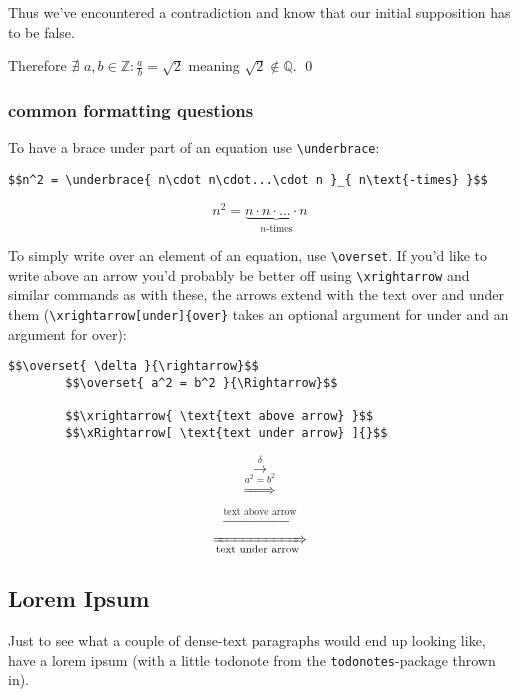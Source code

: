 \documentclass{article}
\begin{document}
    Thus we've encountered a contradiction and know that our initial
    supposition has to be false. 

    Therefore $\nexists \,\, a,b\in\mathbb{Z} : \frac{a}{b} = \sqrt{2}$ meaning
    $\sqrt{2} \not\in \mathbb{Q}$. 
    \qed

    \subsubsection{common formatting questions}
    To have a brace under part of an equation use \verb|\underbrace|:  
    \begin{lstlisting}[style=LaTeX]
        $$n^2 = \underbrace{ n\cdot n\cdot...\cdot n }_{ n\text{-times} }$$
    \end{lstlisting}
        $$n^2 = \underbrace{ n\cdot n\cdot...\cdot n }_{ n\text{-times} }$$

    To simply write over an element of an equation, use \verb|\overset|. 
    If you'd like to write above an arrow you'd probably be better off using
    \verb|\xrightarrow| and similar commands as with these, the arrows extend
    with the text over and under them (\verb|\xrightarrow[under]{over}| takes
    an optional argument for under and an argument for over): 
    \begin{lstlisting}[style=LaTeX]
        $$\overset{ \delta }{\rightarrow}$$
        $$\overset{ a^2 = b^2 }{\Rightarrow}$$

        $$\xrightarrow{ \text{text above arrow} }$$
        $$\xRightarrow[ \text{text under arrow} ]{}$$
    \end{lstlisting}
        $$\overset{ \delta }{\rightarrow}$$
        $$\overset{ a^2 = b^2 }{\Rightarrow}$$

        $$\xrightarrow{ \text{text above arrow} }$$
        $$\xRightarrow[ \text{text under arrow} ]{}$$


    \subsection{Lorem Ipsum}
    Just to see what a couple of dense-text paragraphs would end up looking
    like, have a lorem ipsum (with a little todonote from the
    \texttt{todonotes}-package thrown in). 
	
\end{document}
